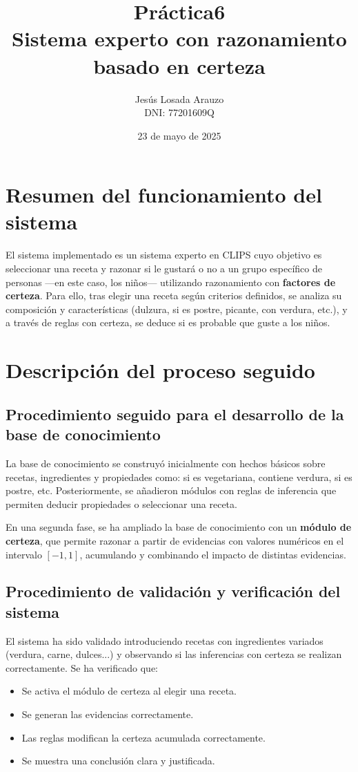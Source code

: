 \documentclass[a4paper,12pt]{article}
\title{\textbf{Práctica6} \\ \large Sistema experto con razonamiento basado en certeza}
\author{Jesús Losada Arauzo\\ DNI: 77201609Q}
\date{23 de mayo de 2025}
\begin{document}
\maketitle
\newpage

\section{Resumen del funcionamiento del sistema}
El sistema implementado es un sistema experto en CLIPS cuyo objetivo es seleccionar una receta y razonar si le gustará o no a un grupo específico de personas ---en este caso, los niños--- utilizando razonamiento con \textbf{factores de certeza}. Para ello, tras elegir una receta según criterios definidos, se analiza su composición y características (dulzura, si es postre, picante, con verdura, etc.), y a través de reglas con certeza, se deduce si es probable que guste a los niños.

\section{Descripción del proceso seguido}

\subsection{Procedimiento seguido para el desarrollo de la base de conocimiento}
La base de conocimiento se construyó inicialmente con hechos básicos sobre recetas, ingredientes y propiedades como: si es vegetariana, contiene verdura, si es postre, etc. Posteriormente, se añadieron módulos con reglas de inferencia que permiten deducir propiedades o seleccionar una receta.

En una segunda fase, se ha ampliado la base de conocimiento con un \textbf{módulo de certeza}, que permite razonar a partir de evidencias con valores numéricos en el intervalo $[-1, 1]$, acumulando y combinando el impacto de distintas evidencias.

\subsection{Procedimiento de validación y verificación del sistema}
El sistema ha sido validado introduciendo recetas con ingredientes variados (verdura, carne, dulces...) y observando si las inferencias con certeza se realizan correctamente. Se ha verificado que:

\begin{itemize}
  \item Se activa el módulo de certeza al elegir una receta.
  \item Se generan las evidencias correctamente.
  \item Las reglas modifican la certeza acumulada correctamente.
  \item Se muestra una conclusión clara y justificada.
\end{itemize}
\end{document}
